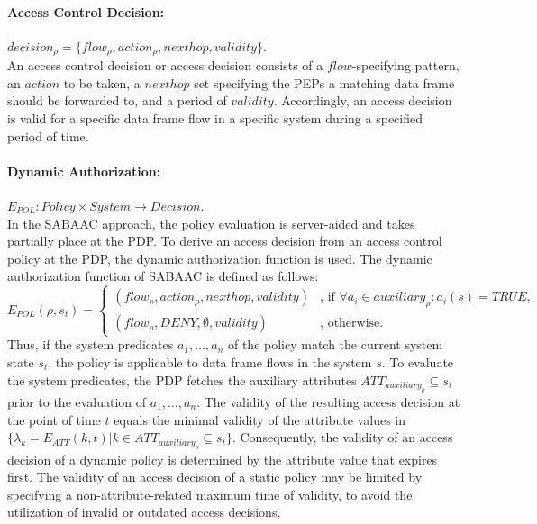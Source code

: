 \paragraph{Access Control Decision:} $decision_{\rho} = \{flow_\rho, action_\rho, nexthop, validity\}$.\\
An access control decision or access decision consists of a $flow$-specifying pattern, an $action$ to be taken, a $nexthop$ set specifying the PEPs a matching data frame should be forwarded to, and a period of $validity$.
Accordingly, an access decision is valid for a specific data frame flow in a specific system during a specified period of time.

\paragraph{Dynamic Authorization:} $E_{POL}: Policy \times System \rightarrow Decision$.\\
In the SABAAC approach, the policy evaluation is server-aided and takes partially place at the PDP.
To derive an access decision from an access control policy at the PDP, the dynamic authorization function is used.
The dynamic authorization function of SABAAC is defined as follows:
\[
    E_{POL}(\rho, s_t) =
    \begin{cases}
        (flow_\rho, action_\rho, nexthop, validity) & \text{, if } \forall a_i \in auxiliary_{\rho}: a_i(s) = TRUE,\\
        (flow_\rho, DENY, \emptyset, validity) & \text{, otherwise.}
    \end{cases}
\]
Thus, if the system predicates $a_1, \dots, a_n$ of the policy match the current system state $s_t$, the policy is applicable to data frame flows in the system $s$.
To evaluate the system predicates, the PDP fetches the auxiliary attributes $ATT_{auxiliary_{\rho}} \subseteq s_t$ prior to the evaluation of $a_1, \dots, a_n$.
The validity of the resulting access decision at the point of time $t$ equals the minimal validity of the attribute values in $\{\lambda_k = E_{ATT}(k, t) | k \in ATT_{auxiliary_{\rho}} \subseteq s_t\}$.
Consequently, the validity of an access decision of a dynamic policy is determined by the attribute value that expires first.
The validity of an access decision of a static policy may be limited by specifying a non-attribute-related maximum time of validity, to avoid the utilization of invalid or outdated access decisions.

